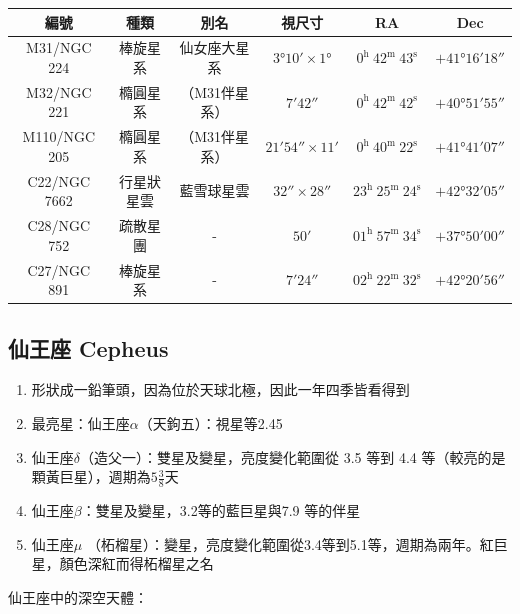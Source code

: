 \begin{center}
\begin{longtable}{c | c | c | c | c | c}
    編號 & 種類 & 別名 & 視尺寸 & RA & Dec \\
    \hline
    \endfirsthead


    \endfoot

    \endlastfoot

    M31/NGC 224 & 棒旋星系 & 仙女座大星系 & \(\ang{3;10;}\times\ang{1;;}\) & \(0^\text{h }42^\text{m }43^\text{s}\) & \(+\ang{41;16;18}\) \\ %
    M32/NGC 221 & 橢圓星系 & （M31伴星系） & \(\ang{;7;42}\) & \(0^\text{h }42^\text{m }42^\text{s}\) & \(+\ang{40;51;55}\) \\ %
    M110/NGC 205 & 橢圓星系 & （M31伴星系） & \(\ang{;21;54}\times\ang{;11;}\) & \(0^\text{h }40^\text{m }22^\text{s}\) & \(+\ang{41;41;07}\) \\ %
    C22/NGC 7662 & 行星狀星雲 & 藍雪球星雲 & \(\ang{;;32}\times\ang{;;28}\) & \(23^\text{h }25^\text{m }24^\text{s}\) & \(+\ang{42;32;05}\) \\ %
    C28/NGC 752 & 疏散星團 & - & \(\ang{;50;}\) & \(01^\text{h }57^\text{m }34^\text{s}\) & \(+\ang{37;50;00}\) \\ %
    C27/NGC 891 & 棒旋星系 & - & \(\ang{;7;24}\) & \(02^\text{h }22^\text{m }32^\text{s}\) & \(+\ang{42;20;56}\) \\ %
\end{longtable}
\end{center}

\subsection{仙王座 Cepheus}
\begin{enumerate}
    \item 形狀成一鉛筆頭，因為位於天球北極，因此一年四季皆看得到
    \item 最亮星：仙王座\(\alpha\)（天鉤五）：視星等2.45
    \item 仙王座\(\delta\)（造父一）：雙星及變星，亮度變化範圍從 3.5 等到 4.4 等（較亮的是顆黃巨星），週期為\(5\frac{3}{8}\)天
    \item 仙王座\(\beta\)：雙星及變星，3.2等的藍巨星與7.9 等的伴星
    \item 仙王座\(\mu\) （柘榴星）：變星，亮度變化範圍從3.4等到5.1等，週期為兩年。紅巨星，顏色深紅而得柘榴星之名
\end{enumerate}
仙王座中的深空天體：
\newline

